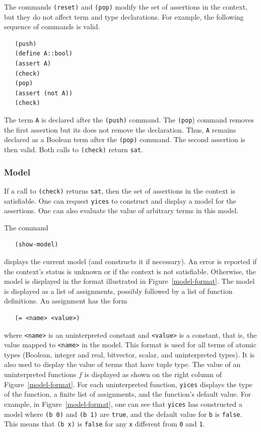 \documentclass[11pt,twoside,fleqn,openright,titlepage]{cslreport}
\begin{document}
\medskip\noindent
The commands \texttt{(reset)} and \texttt{(pop)} modify the set of
assertions in the context, but they do not affect term and type
declarations. For example, the following sequence of commands is
valid.
\begin{small}
\begin{verbatim}
   (push)
   (define A::bool)
   (assert A)
   (check)
   (pop)
   (assert (not A))
   (check)
\end{verbatim}
\end{small}
The term \texttt{A} is declared after the \texttt{(push)} command. The
\texttt{(pop}) command removes the first assertion but its does not
remove the declaration. Thus, \texttt{A} remains declared as a Boolean
term after the \texttt{(pop)} command. The second assertion is then
valid. Both calls to \texttt{(check)} return \texttt{sat}.


\subsubsection*{Model}

If a call to \texttt{(check)} returns \texttt{sat}, then the set of
assertions in the context is satisfiable. One can request
\texttt{yices} to construct and display a model for the
assertions. One can also evaluate the value of arbitrary terms in this
model.

\medskip\noindent
The command
\begin{small}
\begin{verbatim}
   (show-model)
\end{verbatim}
\end{small}
displays the current model (and constructs it if necessary). An error
is reported if the context's status is unknown or if the context is
not satisfiable. Otherwise, the model is displayed in the format
illustrated in Figure~\ref{model-format}. The model is displayed as a
list of assignments, possibly followed by a list of function
definitions. An assignment has the form
\begin{small}
\begin{verbatim}
   (= <name> <value>)
\end{verbatim}
\end{small}
where \texttt{<name>} is an uninterpreted constant and
\texttt{<value>} is a constant, that is, the value mapped to
\texttt{<name>} in the model. This format is used for all terms of
atomic types (Boolean, integer and real, bitvector, scalar, and
uninterpreted types). It is also used to display the value of terms
that have tuple type. The value of an uninterpreted functions $f$ is
displayed as shown on the right column of Figure~\ref{model-format}.
For each uninterpreted function, \texttt{yices} displays the type of
the function, a finite list of assignments, and the function's default
value. For example, in Figure~\ref{model-format}, one can see that
\texttt{yices} has constructed a model where \texttt{(b 0)} and
\texttt{(b 1)} are \texttt{true}, and the default value for \texttt{b}
is \texttt{false}.  This means that \texttt{(b x)} is \texttt{false}
for any \texttt{x} different from \texttt{0} and \texttt{1}.
\end{document}
